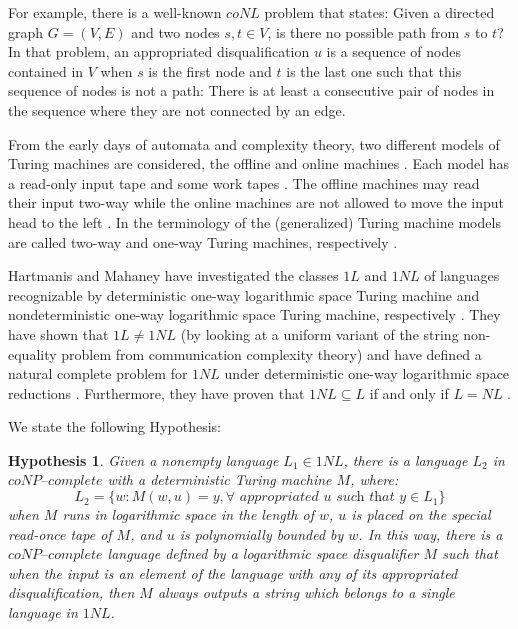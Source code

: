 \documentclass[a4paper,UKenglish,cleveref, autoref]{lipics-v2019}
\newtheorem{hypothesis}[theorem]{Hypothesis}
\begin{document}
For example, there is a well-known $coNL$ problem that states: Given a directed graph $G = (V, E)$ and two nodes $s, t \in V$, is there no possible path from $s$ to $t$? In that problem, an appropriated disqualification $u$ is a sequence of nodes contained in $V$ when $s$ is the first node and $t$ is the last one such that this sequence of nodes is not a path: There is at least a consecutive pair of nodes in the sequence where they are not connected by an edge.

From the early days of automata and complexity theory,  two  different  models  of  Turing  machines  are  considered, the offline and online machines \cite{KU15}. Each model has a read-only input tape and some work tapes \cite{KU15}. The offline machines may read their input two-way while the online machines are not allowed to move the input head to the left \cite{KU15}. In the terminology of the (generalized) Turing machine models are called two-way and one-way Turing machines, respectively \cite{KU15}.

Hartmanis and Mahaney have investigated the classes $1L$ and $1NL$ of languages recognizable by deterministic one-way logarithmic space Turing machine and nondeterministic one-way logarithmic space Turing machine, respectively \cite{HM81}. They have shown that $1L \neq 1NL$ (by looking at a uniform variant of the string non-equality problem from communication complexity theory) and have defined a natural complete problem for $1NL$ under deterministic one-way logarithmic space reductions \cite{HM81}. Furthermore, they have proven that $1NL \subseteq L$ if and only if $L=NL$ \cite{HM81}.

We state the following Hypothesis:

\begin{hypothesis}
\label{hypothesis2}
Given a nonempty language $L_{1} \in 1NL$, there is a language $L_{2}$ in $\textit{coNP--complete}$ with a deterministic Turing machine $M$, where:
\[L_{2} = \{w: M(w, u) = y, \forall \textit{ appropriated } u \textit{ such that } y \in L_{1}\}\]
when $M$ runs in logarithmic space in the length of $w$, $u$ is placed on the special read-once tape of $M$, and $u$ is polynomially bounded by $w$. In this way, there is a $\textit{coNP--complete}$ language defined by a logarithmic space disqualifier $M$ such that when the input is an element of the language with any of its appropriated disqualification, then $M$ always outputs a string which belongs to a single language in $1NL$.
\end{hypothesis}
\end{document}

